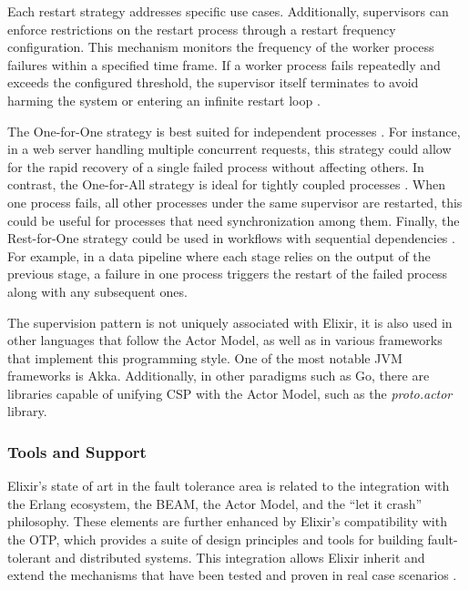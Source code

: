 Each restart strategy addresses specific use cases. Additionally, supervisors can enforce restrictions on the restart process through a restart frequency configuration. This mechanism monitors the frequency of the worker process failures within a specified time frame. If a worker process fails repeatedly and exceeds the configured threshold, the supervisor itself terminates to avoid harming the system or entering an infinite restart loop \cite{Armstrong2013}.

The One-for-One strategy is best suited for independent processes \cite{Armstrong2013}. For instance, in a web server handling multiple concurrent requests, this strategy could allow for the rapid recovery of a single failed process without affecting others. In contrast, the One-for-All strategy is ideal for tightly coupled processes \cite{Armstrong2013}. When one process fails, all other processes under the same supervisor are restarted, this could be useful for processes that need synchronization among them. Finally, the Rest-for-One strategy could be used in workflows with sequential dependencies \cite{elixir-docs-hexdocs}. For example, in a data pipeline where each stage relies on the output of the previous stage, a failure in one process triggers the restart of the failed process along with any subsequent ones.

The supervision pattern is not uniquely associated with Elixir, it is also used in other languages that follow the Actor Model, as well as in various frameworks that implement this programming style. One of the most notable \gls{JVM} frameworks is Akka. Additionally, in other paradigms such as Go, there are libraries capable of unifying \gls{CSP} with the Actor Model, such as the \textit{proto.actor} library.


\subsubsection{Tools and Support}

Elixir’s state of art in the fault tolerance area is related to the integration with the Erlang ecosystem, the \gls{BEAM}, the Actor Model, and the “let it crash” philosophy. These elements are further enhanced by Elixir’s compatibility with the \gls{OTP}, which provides a suite of design principles and tools for building fault-tolerant and distributed systems. This integration allows Elixir inherit and extend the mechanisms that have been tested and proven in real case scenarios \cite{Juric2024,Armstrong2013}.

